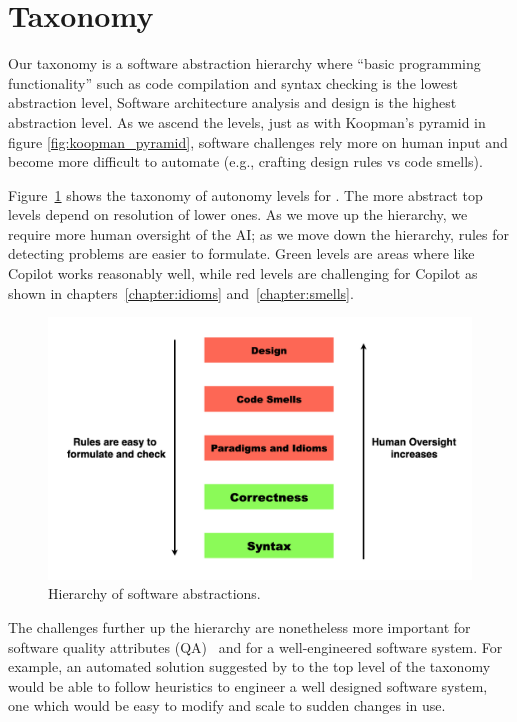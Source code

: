 \section{Taxonomy}
\label{taxonomy}
Our taxonomy is a software abstraction hierarchy where ``basic programming functionality'' such as code compilation and syntax checking is the lowest abstraction level,
Software architecture analysis and design is the highest abstraction level.
As we ascend the levels, just as with Koopman's pyramid in figure \ref{fig:koopman_pyramid}, 
software challenges rely more on human input and become more difficult to automate (e.g., crafting design rules vs code smells).

Figure~\ref{fig:taxonomy} shows the taxonomy of autonomy levels for \cct{}.  The more abstract top levels depend on resolution of lower ones. As we move up the hierarchy, we require more human oversight of the AI; as we move down the hierarchy, rules for detecting problems are easier to formulate. Green levels are areas where \cct{} like Copilot works reasonably well, while red levels are challenging for Copilot as shown in chapters~\ref{chapter:idioms} and~\ref{chapter:smells}.

\begin{figure}[hbt!]
    \centering
    \includegraphics[width=\linewidth]{Figures/taxonomy.png}
    \caption{Hierarchy of software abstractions.}
    \label{fig:taxonomy}
\end{figure}

The challenges further up the hierarchy are nonetheless more important for software quality attributes (QA)~\cite{Ernst2017} and for a well-engineered software system.
For example, an automated solution suggested by \cct{} to the top level of the taxonomy would be able to follow heuristics to engineer a well designed software system, one which would be easy to modify and scale to sudden changes in use.